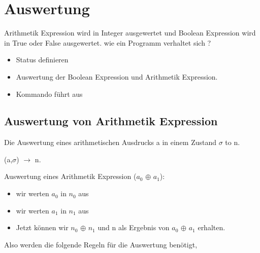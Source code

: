 \documentclass[a4paper,12pt,twoside,headsepline]{scrartcl}
\begin{document}
\section{Auswertung}
Arithmetik Expression wird in Integer ausgewertet und Boolean Expression wird in True oder False  ausgewertet.
wie ein Programm verhaltet sich ?
\begin{itemize}
	\item<1-> Status definieren
	\item<2-> Auswertung der Boolean Expression und Arithmetik Expression.
	\item <3-> Kommando führt aus
\end{itemize}

\subsection{Auswertung von Arithmetik Expression}
Die Auswertung eines arithmetischen Ausdrucks a in einem Zustand  $\sigma$ to n.

\begin{center}  (a,$\sigma$) $\to$ n.    
\end{center}
                      
Auswertung eines Arithmetik Expression  ($a_0$ $\oplus$ $a_1$):
\begin{itemize}
\item wir werten  $a_0$  in $n_0$ aus
\item wir werten $a_1$ in $n_1$ aus
\item Jetzt können wir $n_0$ $\oplus$ $n_1$ und n als Ergebnis von $a_0$ $\oplus$ $a_1$ erhalten.
\end{itemize}
Also werden die folgende Regeln für die Auswertung benötigt,
\end{document}
